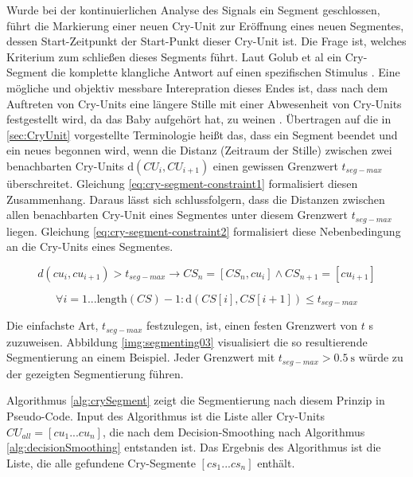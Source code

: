 Wurde bei der kontinuierlichen Analyse des Signals ein Segment geschlossen, führt die Markierung einer neuen Cry-Unit zur Eröffnung eines neuen Segmentes, dessen Start-Zeitpunkt der Start-Punkt dieser Cry-Unit ist. Die Frage ist, welches Kriterium zum schließen dieses Segments führt. Laut Golub et al \cite{cryModel} ein Cry-Segment \glqq die komplette klangliche Antwort auf einen spezifischen Stimulus \grqq. Eine mögliche und objektiv messbare Interepration dieses Endes ist, dass nach dem Auftreten von Cry-Units eine längere Stille mit einer  Abwesenheit von Cry-Units festgestellt wird, da das Baby \glqq aufgehört hat, zu weinen \grqq. Übertragen auf die in \ref{sec:CryUnit} vorgestellte Terminologie heißt das, dass ein Segment beendet und ein neues begonnen wird, wenn die Distanz (Zeitraum der Stille) zwischen zwei benachbarten Cry-Units d$(CU_{i}, CU_{i+1})$ einen gewissen Grenzwert $t_{seg-max}$ überschreitet. Gleichung \ref{eq:cry-segment-constraint1} formalisiert diesen Zusammenhang. Daraus lässt sich schlussfolgern, dass die Distanzen zwischen allen benachbarten Cry-Unit eines Segmentes unter diesem Grenzwert $t_{seg-max}$ liegen. Gleichung \ref{eq:cry-segment-constraint2} formalisiert diese Nebenbedingung an die Cry-Units eines Segmentes. 

\begin{equation}
d(cu_i, cu_{i+1}) > t_{seg-max} \rightarrow CS_{n} =[CS_n, cu_i] \wedge CS_{n+1} = [cu_{i+1}]  
\label{eq:cry-segment-constraint1}
\end{equation}

\begin{equation}
\forall i = 1 ... \text{length}(CS)-1: \text{d}(CS[i], CS[i+1]) \leq t_{seg-max}
\label{eq:cry-segment-constraint2}
\end{equation}

Die einfachste Art, $t_{seg-max}$ festzulegen, ist, einen festen Grenzwert von $t$ s zuzuweisen. Abbildung \ref{img:segmenting03} visualisiert die so resultierende Segmentierung an einem Beispiel. Jeder Grenzwert mit $t_{seg-max} > \SI{0.5}{\second}$ würde zu der gezeigten Segmentierung führen. 

Algorithmus \ref{alg:crySegment} zeigt die Segmentierung nach diesem Prinzip in Pseudo-Code. Input des Algorithmus ist die Liste aller Cry-Units $CU_{all} = [cu_1 ... cu_n]$, die nach dem Decision-Smoothing nach Algorithmus \ref{alg:decisionSmoothing} entstanden ist.  Das Ergebnis des Algorithmus ist die Liste, die alle gefundene Cry-Segmente  $[cs_1 ...  cs_n]$ enthält. 

